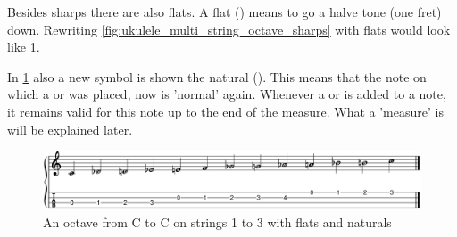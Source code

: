 \newpage

Besides sharps there are also flats. A flat (\flat) means to go a halve tone (one fret) down. Rewriting \ref{fig:ukulele_multi_string_octave_sharps} with flats would look like \ref{fig:ukulele_fretboard_filled_flats}.

In \ref{fig:ukulele_fretboard_filled_flats} also a new symbol is shown the natural (\natural). This means that the note on which a \flat or \sharp was placed, now is 'normal' again. Whenever a \flat or \sharp is added to a note, it remains valid for this note up to the end of the measure. What a 'measure' is will be explained later.

\begin{figure}[h]
    \centering
    \includegraphics[width=\textwidth]{../MuseScore/Ukulele/UkuleleChromaticNotesFlatsMultiString.png}
    \caption{An octave from C to C on strings 1 to 3 with flats and naturals}
    \label{fig:ukulele_fretboard_filled_flats}
\end{figure}